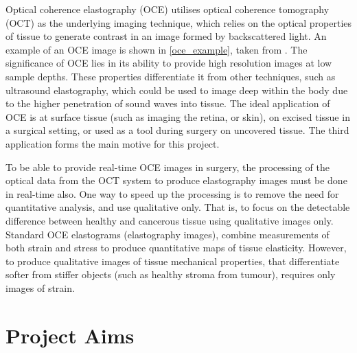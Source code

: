 Optical coherence elastography (OCE) utilises optical coherence tomography (OCT) as the underlying imaging technique, which relies on the optical properties of tissue to generate contrast in an image formed by backscattered light. An example of an OCE image is shown in \autoref{oce_example}, taken from \cite{kennedy_investigation_2015}. The significance of OCE lies in its ability to provide high resolution images at low sample depths. These properties differentiate it from other techniques, such as ultrasound elastography, which could be used to image deep within the body due to the higher penetration of sound waves into tissue. The ideal application of OCE is at surface tissue (such as imaging the retina, or skin), on excised tissue in a surgical setting, or used as a tool during surgery on uncovered tissue. The third application forms the main motive for this project.

To be able to provide real-time OCE images in surgery, the processing of the optical data from the OCT system to produce elastography images must be done in real-time also. One way to speed up the processing is to remove the need for quantitative analysis, and use qualitative only. That is, to focus on the detectable difference between healthy and cancerous tissue using qualitative images only. Standard OCE elastograms (elastography images), combine measurements of both strain and stress to produce quantitative maps of tissue elasticity. However, to produce qualitative images of tissue mechanical properties, that differentiate softer from stiffer objects (such as healthy stroma from tumour), requires only images of strain. 

\section{Project Aims}\label{aims}


